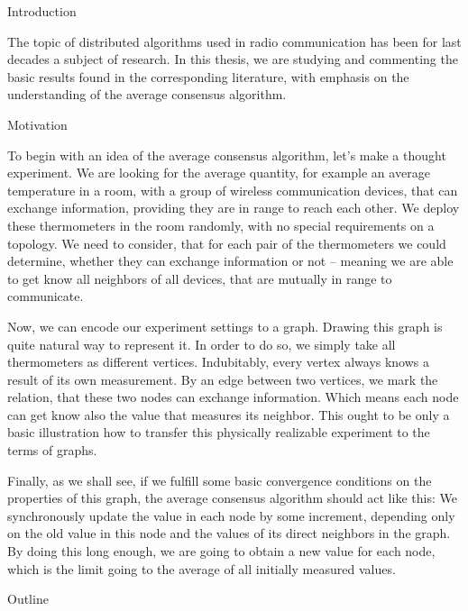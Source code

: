
\def\ctustyle{{\tenss CTUstyle}}
\def\ttb{\tt\char'\\} %

\chap Introduction

The topic of distributed algorithms used in radio communication has been for last decades a subject of research. In this thesis, we are studying and commenting the basic results found in the corresponding literature, with emphasis on the understanding of the average consensus algorithm.

\sec Motivation

To begin with an idea of the average consensus algorithm, let's make a thought experiment. We are looking for the average quantity, for example an average temperature in a room, with a group of wireless communication devices, that can exchange information, providing they are in range to reach each other. We deploy these thermometers in the room randomly, with no special requirements on a topology. We need to consider, that for each pair of the thermometers we could determine, whether they can exchange information or not -- meaning we are able to get know all neighbors of all devices, that are mutually in range to communicate.

Now, we can encode our experiment settings to a graph. Drawing this graph is quite natural way to represent it. In order to do so, we simply take all thermometers as different vertices. Indubitably, every vertex always knows a result of its own measurement. By an edge between two vertices, we mark the relation, that these two nodes can exchange information. Which means each node can get know also the value that measures its neighbor. This ought to be only a basic illustration how to transfer this physically realizable experiment to the terms of graphs.

Finally, as we shall see, if we fulfill some basic convergence conditions on the properties of this graph, the average consensus algorithm should act like this: We synchronously update the value in each node by some increment, depending only on the old value in this node and the values of its direct neighbors in the graph. By doing this long enough, we are going to obtain a new value for each node, which is the limit going to the average of all initially measured values.

\sec Outline


